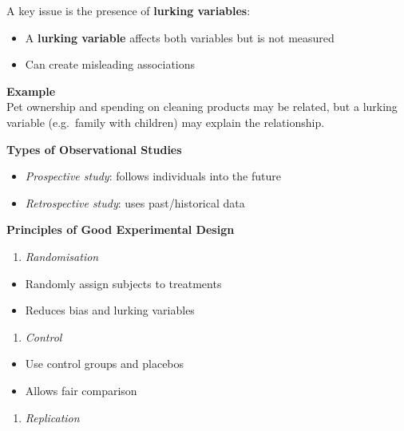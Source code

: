 \documentclass[
  11pt,
  oneside]{scrbook}
\providecommand{\tightlist}{%
  \setlength{\itemsep}{0pt}\setlength{\parskip}{0pt}}
\begin{document}
A key issue is the presence of \textbf{lurking variables}:

\begin{itemize}
\tightlist
\item
  A \textbf{lurking variable} affects both variables but is not measured
\item
  Can create misleading associations
\end{itemize}

\textbf{Example}\\
Pet ownership and spending on cleaning products may be related, but a lurking variable (e.g.~family with children) may explain the relationship.

\textbf{Types of Observational Studies}

\begin{itemize}
\tightlist
\item
  \emph{Prospective study}: follows individuals into the future\\
\item
  \emph{Retrospective study}: uses past/historical data
\end{itemize}

\textbf{Principles of Good Experimental Design}

\begin{enumerate}
\def\labelenumi{\arabic{enumi}.}
\tightlist
\item
  \emph{Randomisation}
\end{enumerate}

\begin{itemize}
\tightlist
\item
  Randomly assign subjects to treatments
\item
  Reduces bias and lurking variables
\end{itemize}

\begin{enumerate}
\def\labelenumi{\arabic{enumi}.}
\setcounter{enumi}{1}
\tightlist
\item
  \emph{Control}
\end{enumerate}

\begin{itemize}
\tightlist
\item
  Use control groups and placebos
\item
  Allows fair comparison
\end{itemize}

\begin{enumerate}
\def\labelenumi{\arabic{enumi}.}
\setcounter{enumi}{2}
\tightlist
\item
  \emph{Replication}
\end{enumerate}
\end{document}
